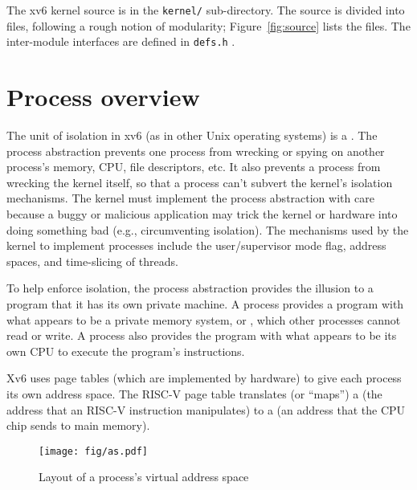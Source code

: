 The xv6 kernel source is in the {\tt kernel/} sub-directory. The
source is divided into files, following a rough notion of modularity;
Figure~\ref{fig:source} lists the files.  The inter-module interfaces
are defined in \lstinline{defs.h} .

\section{Process overview}

The unit of isolation in xv6 (as in other Unix operating systems) is a 
.
The process abstraction prevents one process from wrecking or spying on
another process's memory, CPU, file descriptors, etc.  It also prevents a process
from wrecking the kernel itself, so that a process can't subvert the kernel's
isolation mechanisms.
The kernel must implement the process abstraction with care because
a buggy or malicious application may trick the kernel or hardware into doing
something bad (e.g., circumventing isolation).  The mechanisms used by
the kernel to implement processes include the user/supervisor mode flag, address spaces,
and time-slicing of threads.

To help enforce isolation, the process abstraction provides the
illusion to a program that it has its own private machine.  A process provides
a program with what appears to be a private memory system, or
, 
which other processes cannot read or write.
A process also provides the program with what appears to be its own
CPU to execute the program's instructions.

Xv6 uses page tables (which are implemented by hardware) to give each process
its own address space. The RISC-V page table
translates (or ``maps'') a
(the address that an RISC-V instruction manipulates) to a
(an address that the CPU chip sends to main memory).

\begin{figure}[t]
\centering
\texttt{[image: fig/as.pdf]}
\caption{Layout of a process's virtual address space}
\label{fig:as}
\end{figure}

